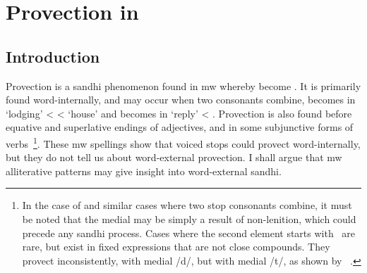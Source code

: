 



\chapter{Provection in }





 \section{Introduction}
Provection is a sandhi phenomenon found in \gls{mw} whereby  become . It is primarily found word-internally, and may occur when two consonants combine, \eg {} becomes  in  `lodging' <  <  `house' and  becomes  in  `reply' < . Provection is also found before equative and superlative endings of adjectives, and in some subjunctive forms of verbs~\parencite[\S 17]{evans_grammar_1964}\footnote{In the case of  and similar cases where two stop consonants combine, it must be noted that the medial  may be simply a result of non-lenition, which could precede any sandhi process. Cases where the second element starts with \xD\ are rare, but exist in fixed expressions that are not close compounds. They provect inconsistently, \eg {} with medial /d/, but  with medial /t/, as shown by ~\autocite[s.v.\ \emph{rhad}]{bevan_geiriadur_2014}.}. These \gls{mw} spellings show that voiced stops could provect word-internally, but they do not tell us about word-external provection. I shall argue that \gls{mw} alliterative patterns may give insight into word-external sandhi.

